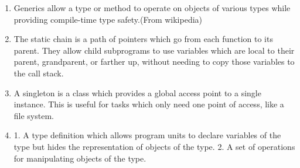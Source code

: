 \begin{answer}
\begin{enumerate}
\item Generics allow a type or method to operate on objects of various types while providing compile-time type safety.(From wikipedia)
\item The static chain is a path of pointers which go from each function to its parent. They allow child subprograms to use variables which are local to their parent, grandparent, or farther up, without needing to copy those variables to the call stack.
\item A singleton is a class which provides a global access point to a single instance. This is useful for tasks which only need one point of access, like a file system.
\item 1. A type definition which allows program units to declare variables of the type but hides the representation of objects of the type. 2. A set of operations for manipulating objects of the type.

\end{enumerate}
\end{answer}


